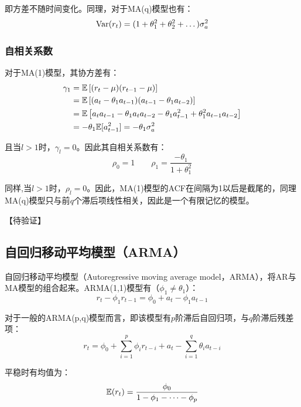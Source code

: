 \documentclass[11pt]{article}
\begin{document}
即方差不随时间变化。同理，对于MA(q)模型也有：
\begin{equation*}
    \operatorname{Var}(r_t) = (1 + \theta_1^2 + \theta_2^2 + \dots ) \sigma_{a}^{2}
\end{equation*}

\subsubsection*{自相关系数}

对于MA(1)模型，其协方差有：
\begin{align*}
    \gamma_1 &= \mathbb{E}\left[(r_t - \mu)(r_{t-1} - \mu)\right] \\
    &= \mathbb{E}\left[(a_t - \theta_1 a_{t-1})(a_{t-1} - \theta_1 a_{t-2})\right] \\
    &= \mathbb{E}\left[ a_{t} a_{t-1} - \theta_1 a_{t} a_{t-2} - \theta_1 a_{t-1}^{2} + \theta_1^2 a_{t-1} a_{t-2} \right] \\
    &= -\theta_1 \mathbb{E}[a_{t-1}^2] = -\theta_1 \sigma_{a}^{2}
\end{align*}

且当$l>1$时，$\gamma_l=0$。因此其自相关系数有：
\begin{equation*}
    \rho_0 = 1 \qquad \rho_1=\frac{-\theta_1}{1 + \theta_1^2}
\end{equation*}

同样,当$l>1$时，$\rho_l=0$。因此，MA(1)模型的ACF在间隔为1以后是截尾的，同理MA(q)模型只与前$q$个滞后项线性相关，因此是一个有限记忆的模型。

【待验证】

\subsection{自回归移动平均模型（ARMA）}

自回归移动平均模型（Autoregressive moving average model，ARMA），将AR与MA模型的组合起来。ARMA(1,1)模型有（$\phi_1 \neq \theta_1$）：
\begin{equation*}
    r_t - \phi_1 r_{t-1} = \phi_0 + a_t - \phi_1 a_{t-1}
\end{equation*}

对于一般的ARMA(p,q)模型而言，即该模型有$p$阶滞后自回归项，与$q$阶滞后残差项：
\begin{equation*}
    r_t = \phi_0 + \sum_{i=1}^{p} \phi_i r_{t-i} + a_t - \sum_{i=1}^{q} \theta_i a_{t-i}
\end{equation*}

平稳时有均值为：
\begin{equation*}
    \mathbb{E}(r_t) = \frac{\phi_0}{1-\phi_1-\dots-\phi_p}
\end{equation*}
\end{document}
